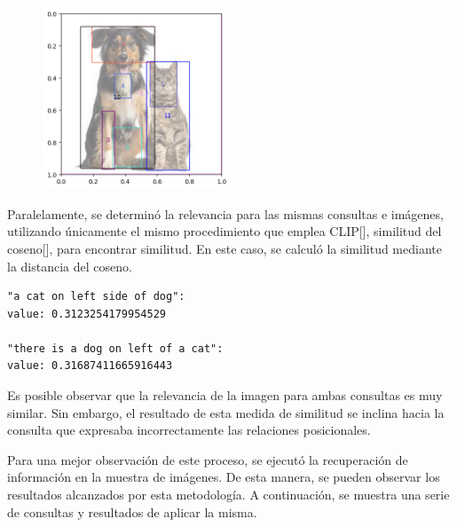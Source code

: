 \begin{figure}[H]
\centering
 \includegraphics[width=0.5\textwidth]{Graphics/dog_in_left.png}
 \caption{ }
 \label{fig:dog}
\end{figure}

Paralelamente, se determinó la relevancia para las mismas consultas e im\'agenes, utilizando únicamente el mismo procedimiento que emplea CLIP[\cite{clip}], similitud del coseno[\cite{git-clip}], para encontrar similitud. En este caso, se calculó la similitud mediante la distancia del coseno.

\begin{verbatim}
"a cat on left side of dog":
value: 0.3123254179954529

"there is a dog on left of a cat":
value: 0.31687411665916443
\end{verbatim}

Es posible observar que la relevancia de la imagen para ambas consultas es muy similar. Sin embargo, el resultado de esta medida de similitud se inclina hacia la consulta que expresaba incorrectamente las relaciones posicionales.

Para una mejor observación de este proceso, se ejecutó la recuperación de información en la muestra de im\'agenes. De esta manera, se pueden observar los resultados alcanzados por esta metodología. A continuación, se muestra una serie de consultas y resultados de aplicar la misma.

